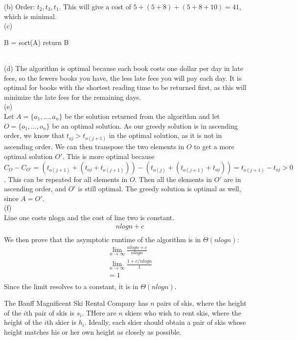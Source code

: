 \documentclass{assignment}
\begin{document}
\begin{problemlist}
\begin{answer}
(b) Order: $t_2, t_3, t_1$. This will give a cost of $5 + (5+8) + (5+8+10) = 41$, which is minimal.\\
(c)
 \begin {algorithm}
B = sort(A)\;
return B\;
\end {algorithm}
\\
(d) The algorithm is optimal because each book costs one dollar per day in late fees, so the fewers books you have, the less late fees you will pay each day.  It is optimal for books with the shortest reading time to be returned first, as this will minimize the late fees for the remaining days.\\
(e)\\
Let $A=\{a_1,\ldots,a_n\}$ be the solution returned from the algorithm and let $O=\{o_1,\ldots,o_n\}$ be an optimal solution. As our greedy solution is in ascending order, we know that $t_{oj} > t_{o(j+1)}$ in the optimal solution, as it is not in ascending order. We can then transpose the two elements in $O$ to get a more optimal solution $O'$. This is more optimal because $C_O - C_{O'} = (t_{o(j+1)} + (t_{oj} + t_{o(j+1)})) - (t_{o(j)} + (t_{o(j+1)} + t_{oj})) = t_{o(j+1)} - t_{oj} > 0$. This can be repeated for all elements in $O$. Then all the elements in $O'$ are in ascending order, and $O'$ is still optimal. The greedy solution is optimal as well, since $A=O'$.\\
(f) \\Line one costs nlogn and the cost of line two is constant.\\
\begin {align*}
&nlogn + c\\
\end{align*}
We then prove that the asymptotic runtime of the algorithm is in $\Theta (nlogn)$:\\
\begin{align*}
&\lim_{n\rightarrow \infty} \frac{nlogn + c}{nlogn}\\
&\lim_{n\rightarrow \infty} \frac{1 + c/nlogn}{1}\\
&= 1\\
\end {align*}
Since the limit resolves to a constant, it is in $\Theta (nlogn)$.
\end{answer}
\clearpage
\pbitem
\begin{problem}
The Banff Magnificent Ski Rental Company has $n$ pairs of skis, where the height of the $i$th pair of skis is $s_i$. THere are $n$ skiers who wish to rent skis, where the height of the $i$th skier is $h_i$. Ideally, each skier should obtain a pair of skis whose height matches his or her own height as closely as possible.\\

\end{problem}
\end{problemlist}
\end{document}
